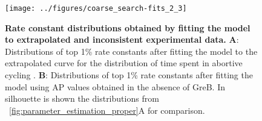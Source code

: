 \begin{figure}[h]
    \begin{center}
      \texttt{[image: ../figures/coarse\_search-fits\_2\_3]}
    \end{center}
    \caption{
      {\bf Rate constant distributions obtained by fitting the model to
      extrapolated and inconsistent experimental data.} \textbf{A}:
      Distributions of top 1\% rate constants after fitting the model to the
      extrapolated curve for the distribution of time spent in abortive
      cycling \cite{revyakin_abortive_2006}. \textbf{B}: Distributions of top
      1\% rate constants after fitting the model using AP values obtained in the
      absence of GreB. In silhouette is shown the distributions from
      \FIG~\ref{fig:parameter_estimation_proper}A for comparison.}
      \label{fig:extrap_and_GreB_minus_fit}
\end{figure}



